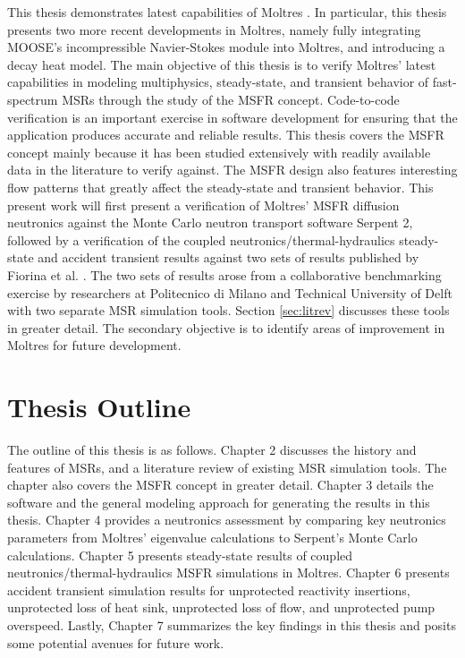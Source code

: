 This thesis demonstrates latest capabilities of Moltres
\cite{lindsay_introduction_2018}.
In particular, this thesis presents two more recent
developments in Moltres, namely fully integrating \gls{MOOSE}'s incompressible
Navier-Stokes module into Moltres, and introducing a
decay heat model.
The main objective of this thesis is to verify Moltres'
latest capabilities in modeling multiphysics, steady-state, and transient
behavior of fast-spectrum \glspl{MSR} through the study of the \gls{MSFR}
concept. Code-to-code verification is an important exercise in software
development for ensuring that the application produces accurate and reliable
results. This thesis covers the \gls{MSFR} concept mainly because it has been
studied extensively with readily available data in the literature to verify
against. The \gls{MSFR} design also features interesting flow
patterns that greatly affect the steady-state and transient behavior. This
present work will first present a verification of Moltres' \gls{MSFR}
diffusion neutronics against the Monte Carlo neutron transport software
Serpent 2, followed by a verification of
the coupled neutronics/thermal-hydraulics steady-state and accident transient
results against two sets of results published by
Fiorina et al. \cite{fiorina_modelling_2014}. The two sets of results arose
from a collaborative benchmarking exercise by researchers at Politecnico di
Milano and Technical University of Delft with two separate \gls{MSR}
simulation tools. Section \ref{sec:litrev} discusses these tools
in greater detail. The
secondary objective is to identify areas of improvement in Moltres for future
development.

\section{Thesis Outline}

The outline of this thesis is as follows. Chapter 2 discusses the history and
features of \glspl{MSR}, and a literature review of existing \gls{MSR}
simulation tools. The chapter also covers the \gls{MSFR} concept in greater
detail. Chapter 3 details the software and the general modeling
approach for generating the results in this thesis. Chapter 4 provides a
neutronics assessment by comparing key neutronics parameters from Moltres'
eigenvalue calculations to Serpent's Monte Carlo calculations. Chapter 5
presents steady-state results of coupled neutronics/thermal-hydraulics
\gls{MSFR} simulations in Moltres. Chapter 6 presents accident transient
simulation results for unprotected reactivity insertions, unprotected loss of
heat sink, unprotected loss of flow, and unprotected pump overspeed. Lastly,
Chapter 7 summarizes the key findings in this thesis
and posits some potential avenues for future work.

